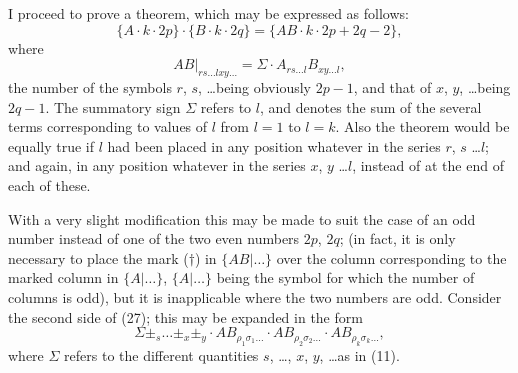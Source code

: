 \documentclass[11pt,a4paper]{article}
\theoremstyle{plain}
\theoremstyle{definition}
\theoremstyle{remark}
\begin{document}
\newpage
I proceed to prove a theorem, which may be expressed as follows:
\[
\{A \cdot k \cdot 2p\} \cdot \{B \cdot k \cdot 2q\} = \{AB \cdot k \cdot 2p + 2q - 2\}
\tag{27},
\]
where
\[
AB|_{rs\ldots lxy\ldots} = \Sigma \cdot A_{rs\ldots l} B_{xy\ldots l}
\tag{28},
\]
the number of the symbols $r$, $s$, \ldots being obviously $2p-1$, and that of $x$, $y$, \ldots being
$2q-1$. The summatory sign $\Sigma$ refers to $l$, and denotes the sum of the several terms
corresponding to values of $l$ from $l=1$ to $l=k$. Also the theorem would be equally
true if $l$ had been placed in any position whatever in the series $r$, $s$ \ldots $l$; and again,
in any position whatever in the series $x$, $y$ \ldots $l$, instead of at the end of each of these.

With a very slight modification this may be made to suit the case of an odd number
instead of one of the two even numbers $2p$, $2q$; (in fact, it is only necessary to place
the mark ($\dagger$) in $\{AB|\ldots\}$ over the column corresponding to the marked column in
$\{A|\ldots\}$, $\{A|\ldots\}$ being the symbol for which the number of columns is odd), but it is
inapplicable where the two numbers are odd. Consider the second side of (27); this
may be expanded in the form
\[
\Sigma \pm_s \ldots \pm_x \pm_y \cdot AB_{\rho_1\sigma_1\ldots} \cdot AB_{\rho_2\sigma_2\ldots} \cdot AB_{\rho_k\sigma_k\ldots}
\tag{29},
\]
where $\Sigma$ refers to the different quantities $s$, \ldots, $x$, $y$, \ldots as in (11).
\end{document}
